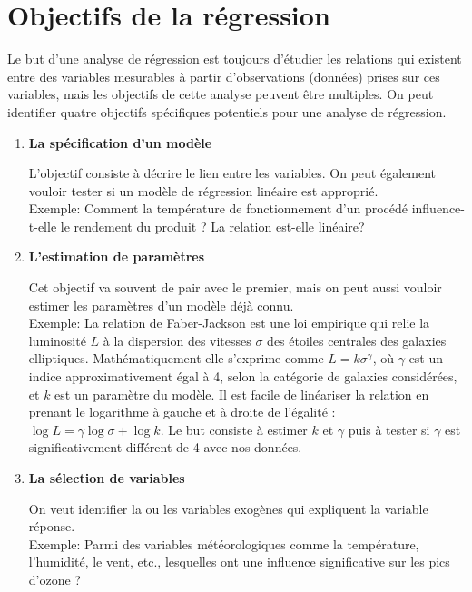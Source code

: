 \newpage

\section{Objectifs de la régression}

Le but d'une analyse de régression est toujours d'étudier les relations qui existent
entre des variables mesurables à partir d'observations (données) prises sur ces variables, mais les objectifs de cette analyse peuvent être multiples. On peut identifier quatre objectifs spécifiques potentiels pour une analyse de régression.

\begin{enumerate}
\item \textbf{La spécification d'un modèle}

L'objectif consiste à décrire le lien entre les variables. On peut également vouloir tester si un modèle de régression linéaire est approprié. \\ Exemple: Comment la température de fonctionnement d'un procédé influence-t-elle le rendement du produit ? La relation est-elle linéaire?


\item \textbf{L'estimation de paramètres}

Cet objectif va souvent de pair avec le premier, mais on peut aussi vouloir estimer les paramètres d'un modèle déjà connu.\\
Exemple: La relation de Faber-Jackson est une loi empirique qui relie la luminosité $L$ à la dispersion des vitesses $\sigma$ des étoiles centrales des galaxies elliptiques. Mathématiquement elle s'exprime comme $L=k\sigma^\gamma$, où $\gamma$ est un indice approximativement égal à 4, selon la catégorie de galaxies considérées, et $k$ est un paramètre du modèle. Il est facile de linéariser la relation en prenant le logarithme à gauche et à droite de l'égalité : $\log L=\gamma\log\sigma+\log k$. Le but consiste à estimer $k$ et $\gamma$ puis à tester si $\gamma$ est significativement différent de 4 avec nos données.

\item \textbf{La sélection de variables}

On veut identifier la ou les variables exogènes qui expliquent la variable réponse.\\
Exemple: Parmi des variables météorologiques comme la température, l'humidité, le vent, etc., lesquelles ont une influence significative sur les pics d'ozone ?


\end{enumerate}
